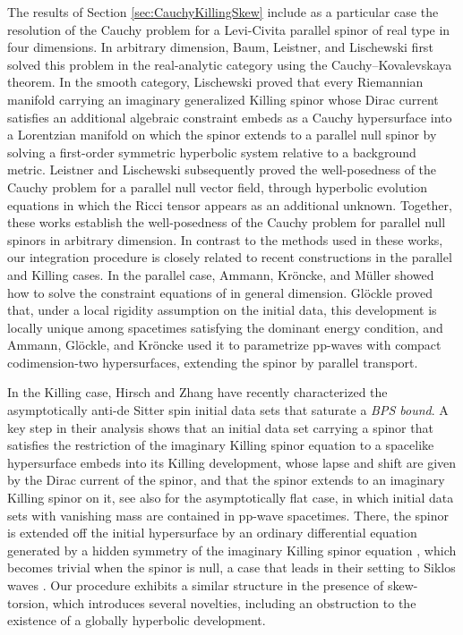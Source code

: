 \documentclass[10pt,reqno,a4paper]{amsart}
\theoremstyle{plain}
\theoremstyle{definition}
\theoremstyle{remark}
\theoremstyle{remark}
\renewcommand{\(}{ (}
\renewcommand{\)}{ )}
\begin{document}
The results of Section \ref{sec:CauchyKillingSkew} include as a particular case the resolution of the Cauchy problem for a Levi-Civita parallel spinor of real type in four dimensions. In arbitrary dimension, Baum, Leistner, and Lischewski first solved this problem in the real-analytic category \cite{BaumLeistnerLischewski} using the Cauchy--Kovalevskaya theorem. In the smooth category, Lischewski \cite{Lischewski} proved that every Riemannian manifold carrying an imaginary generalized Killing spinor whose Dirac current satisfies an additional algebraic constraint embeds as a Cauchy hypersurface into a Lorentzian manifold on which the spinor extends to a parallel null spinor by solving a first-order symmetric hyperbolic system relative to a background metric. Leistner and Lischewski \cite{LeistnerLischewski} subsequently proved the well-posedness of the Cauchy problem for a parallel null vector field, through hyperbolic evolution equations in which the Ricci tensor appears as an additional unknown. Together, these works establish the well-posedness of the Cauchy problem for parallel null spinors in arbitrary dimension. In contrast to the methods used in these works, our integration procedure is closely related to recent constructions in the parallel and Killing cases. In the parallel case, Ammann, Kr\"oncke, and M\"uller \cite{AmmannKronckeMuller} showed how to solve the constraint equations of \cite{BaumLeistnerLischewski} in general dimension. Gl\"ockle \cite{Glockle} proved that, under a local rigidity assumption on the initial data, this development is locally unique among spacetimes satisfying the dominant energy condition, and Ammann, Gl\"ockle, and Kr\"oncke \cite{AmmannGlockleKroncke} used it to parametrize pp-waves with compact codimension-two hypersurfaces, extending the spinor by parallel transport.   \medskip

In the Killing case, Hirsch and Zhang \cite{HirschZhang} have recently characterized the asymptotically anti-de Sitter spin initial data sets that saturate a \emph{BPS bound}. A key step in their analysis \cite[Theorem 6.2]{HirschZhang} shows that an initial data set carrying a spinor that satisfies the restriction of the imaginary Killing spinor equation to a spacelike hypersurface embeds into its Killing development, whose lapse and shift are given by the Dirac current of the spinor, and that the spinor extends to an imaginary Killing spinor on it, see also \cite{HirschZhangpp} for the asymptotically flat case, in which initial data sets with vanishing mass are contained in pp-wave spacetimes. There, the spinor is extended off the initial hypersurface by an ordinary differential equation generated by a hidden symmetry of the imaginary Killing spinor equation \cite[Theorem 6.1]{HirschZhang}, which becomes trivial when the spinor is null, a case that leads in their setting to Siklos waves \cite[Theorem 8.11]{HirschZhang}. Our procedure exhibits a similar structure in the presence of skew-torsion, which introduces several novelties, including an obstruction to the existence of a globally hyperbolic development.   \medskip
\end{document}
